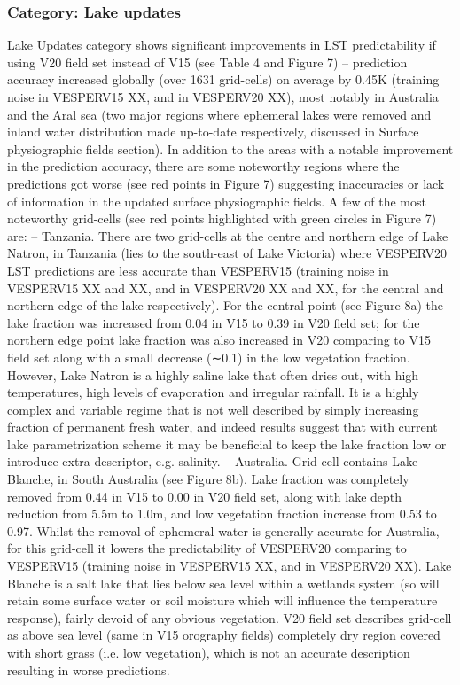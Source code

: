 \documentclass[hess, manuscript]{copernicus}
\begin{document}
\subsubsection{Category: Lake updates}
Lake Updates category shows significant improvements in LST predictability if using V20 field set instead of V15 (see Table 4 and Figure 7) – prediction accuracy increased globally (over 1631 grid-cells) on average by 0.45K (training noise in VESPERV15 XX, and in VESPERV20 XX), most notably in Australia and the Aral sea (two major regions where ephemeral lakes were removed and inland water distribution made up-to-date respectively, discussed in Surface physiographic fields section). In addition to the areas with a notable improvement in the prediction accuracy, there are some noteworthy regions where the predictions got worse (see red points in Figure 7) suggesting inaccuracies or lack of information in the updated surface physiographic fields. A few of the most noteworthy grid-cells (see red points highlighted with green circles in Figure 7) are:
– Tanzania. There are two grid-cells at the centre and northern edge of Lake Natron, in Tanzania (lies to the south-east of Lake Victoria) where VESPERV20 LST predictions are less accurate than VESPERV15 (training noise in VESPERV15 XX and XX, and in VESPERV20 XX and XX, for the central and northern edge of the lake respectively). For the central point (see Figure 8a) the lake fraction was increased from 0.04 in V15 to 0.39 in V20 field set; for the northern edge point lake fraction was also increased in V20 comparing to V15 field set along with a small decrease (∼0.1) in the low vegetation fraction. However, Lake Natron is a highly saline lake that often dries out, with high temperatures, high levels of evaporation and irregular rainfall. It is a highly complex and variable regime that is not well described by simply increasing fraction of permanent fresh water, and indeed results suggest that with current lake parametrization scheme it may be beneficial to keep the lake fraction low or introduce extra descriptor, e.g. salinity. 
– Australia. Grid-cell contains Lake Blanche, in South Australia (see Figure 8b). Lake fraction was completely removed from 0.44 in V15 to 0.00 in V20 field set, along with lake depth reduction from 5.5m to 1.0m, and low vegetation fraction increase from 0.53 to 0.97. Whilst the removal of ephemeral water is generally accurate for Australia, for this grid-cell it lowers the predictability of VESPERV20 comparing to VESPERV15 (training noise in VESPERV15 XX, and in VESPERV20 XX). Lake Blanche is a salt lake that lies below sea level within a wetlands system (so will retain some surface water or soil moisture which will influence the temperature response), fairly devoid of any obvious vegetation. V20 field set describes grid-cell as above sea level (same in V15 orography fields) completely dry region covered with short grass (i.e. low vegetation), which is not an accurate description resulting in worse predictions.
\end{document}

